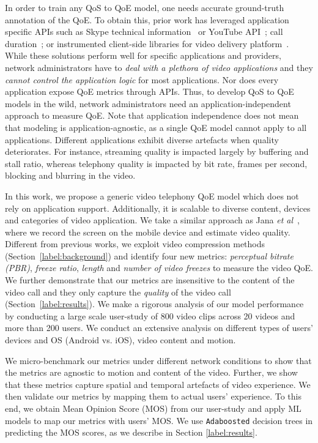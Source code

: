 In order to train any QoS to QoE model, one needs accurate ground-truth annotation of the QoE. To obtain this, prior work has leveraged application specific APIs such as Skype technical information~\cite{zhang2012profiling} or YouTube API~\cite{aggarwal2014prometheus}; call duration~\cite{chen2006quantifying}; or instrumented client-side libraries for video delivery platform~\cite{balachandran2013developing}. While these solutions perform well for specific applications and providers, network administrators have to \emph{deal with a plethora of video applications} and they \emph{cannot control the application logic} for most applications. Nor does every application expose QoE metrics through APIs. 
Thus, to develop QoS to QoE models in the wild, network administrators need an application-independent approach to measure QoE. Note that application independence does not mean that modeling is application-agnostic, as a single QoE model cannot apply to all applications. Different applications exhibit diverse artefacts when quality deteriorates. For instance, streaming quality is impacted largely by buffering and stall ratio, whereas telephony quality is impacted by bit rate, frames per second, blocking and blurring in the video.

In this work, we propose a generic video telephony QoE model which does not rely on application support. Additionally, it is scalable to diverse content, devices and categories of video application. We take a similar approach as Jana {\em et al}~\cite{jana2016qoe}, where we record the screen on the mobile device and estimate video quality. Different from previous works, we exploit video compression methods (Section~\ref{label:background}) and identify four new metrics: {\em perceptual bitrate (PBR)}, {\em freeze ratio}, {\em length} and {\em number of video freezes} to measure 
the video QoE. We further demonstrate that our metrics are insensitive to the content of the video call and they only capture the {\em quality} of the video call (Section~\ref{label:results}). We make a rigorous analysis of our model performance by conducting a large scale user-study of 800 video clips across 20 videos and more than 200 users. We conduct an extensive analysis on different types of users' devices and OS (Android vs. iOS), video content and motion.  

We micro-benchmark our metrics under different network conditions to show that the metrics are agnostic to motion and content of the video.
Further, we show that these metrics capture spatial and temporal artefacts of video experience.
We then validate our metrics by mapping them to actual users' experience. To this end, we obtain Mean Opinion Score (MOS) from our user-study and apply ML models to map our metrics with users' MOS.
We use \texttt{Adaboosted} decision trees in predicting the MOS scores, as we describe in Section \ref{label:results}.


